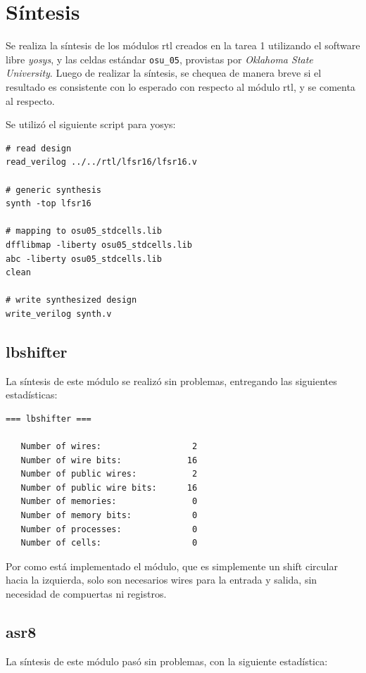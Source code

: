 \documentclass[letterpaper, 12pt]{article}
\numberwithin{equation}{section}
\begin{document}
\section{Síntesis}

Se realiza la síntesis de los módulos rtl creados en la tarea 1 utilizando el software libre \emph{yosys}, y las celdas estándar \texttt{osu\_05}, provistas por \emph{Oklahoma State University}. Luego de realizar  la síntesis, se chequea de manera breve si el resultado es consistente con lo esperado con respecto al módulo rtl, y se comenta al respecto.

Se utilizó el siguiente script para yosys:

\begin{verbatim}
# read design
read_verilog ../../rtl/lfsr16/lfsr16.v

# generic synthesis
synth -top lfsr16

# mapping to osu05_stdcells.lib
dfflibmap -liberty osu05_stdcells.lib
abc -liberty osu05_stdcells.lib
clean

# write synthesized design
write_verilog synth.v
\end{verbatim}

\subsection{lbshifter}

La síntesis de este módulo se realizó sin problemas, entregando las siguientes estadísticas:

\begin{verbatim}
=== lbshifter ===

   Number of wires:                  2
   Number of wire bits:             16
   Number of public wires:           2
   Number of public wire bits:      16
   Number of memories:               0
   Number of memory bits:            0
   Number of processes:              0
   Number of cells:                  0
\end{verbatim}

Por como está implementado el módulo, que es simplemente un shift circular hacia la izquierda, solo son necesarios wires para la entrada y salida, sin necesidad de compuertas ni registros.

\subsection{asr8}

La síntesis de este módulo pasó sin problemas, con la siguiente estadística:
\end{document}
